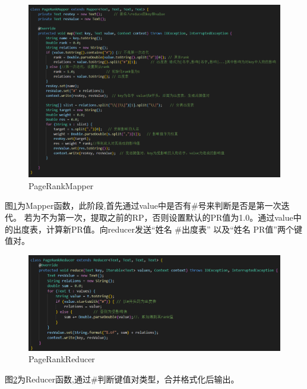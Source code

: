 \documentclass[a4paper,UTF8]{article}
\numberwithin{equation}{section}
\begin{document}
\begin{figure}[H]
    \centering
    \includegraphics[width = 15cm]{PageRankMapper.png}
    \caption{PageRankMapper}
    \label{PageRankMapper}
\end{figure}
图\ref{PageRankMapper}为Mapper函数，此阶段,首先通过value中是否有\#号来判断是否是第一次迭代。
若为不为第一次，提取之前的RP，否则设置默认的PR值为1.0。通过value中的出度表，计算新PR值。向reducer发送“姓名 \#出度表”
以及“姓名 PR值”两个键值对。\\
\begin{figure}[H]
    \centering
    \includegraphics[width = 15cm]{PageRankReducer.png}
    \caption{PageRankReducer}
    \label{PageRankReducer}
\end{figure}
图\ref{PageRankReducer}为Reducer函数,通过\#判断键值对类型，合并格式化后输出。\\\\
\end{document}
